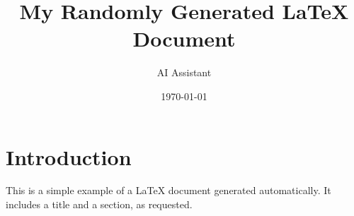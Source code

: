 \documentclass{article}
\title{My Randomly Generated LaTeX Document}
\author{AI Assistant}
\date{\today}
\begin{document}
\maketitle

\section{Introduction}
This is a simple example of a LaTeX document generated automatically. It includes a title and a section, as requested.
\end{document}
